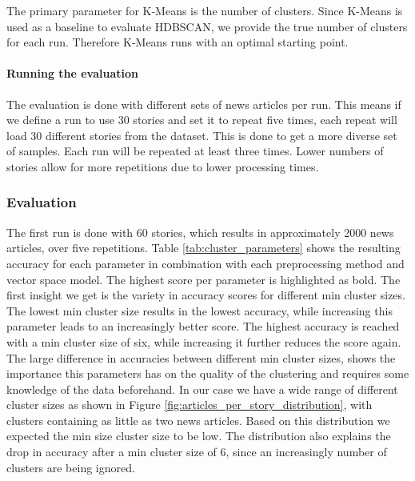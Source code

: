 The primary parameter for K-Means is the number of clusters. Since K-Means is used as a baseline to evaluate HDBSCAN, we provide the true number of clusters for each run. Therefore K-Means runs with an optimal starting point. 

\paragraph{Running the evaluation} The evaluation is done with different sets of news articles per run. This means if we define a run to use 30 stories and set it to repeat five times, each repeat will load 30 different stories from the dataset. This is done to get a more diverse set of samples. Each run will be repeated at least three times. Lower numbers of stories allow for more repetitions due to lower processing times.   

\subsubsection{Evaluation}

The first run is done with 60 stories, which results in approximately 2000 news articles, over five repetitions. Table \ref{tab:cluster_parameters} shows the resulting accuracy for each parameter in combination with each preprocessing method and vector space model. The highest score per parameter is highlighted as bold. The first insight we get is the variety in accuracy scores for different min cluster sizes. The lowest min cluster size results in the lowest accuracy, while increasing this parameter leads to an increasingly better score. The highest accuracy is reached with a min cluster size of six, while increasing it further reduces the score again. The large difference in accuracies between different min cluster sizes, shows the importance this parameters has on the quality of the clustering and requires some knowledge of the data beforehand. In our case we have a wide range of different cluster sizes as shown in Figure \ref{fig:articles_per_story_distribution}, with clusters containing as little as two news articles. Based on this distribution we expected the min size cluster size to be low. The distribution also explains the drop in accuracy after a min cluster size of 6, since an increasingly number of clusters are being ignored.

